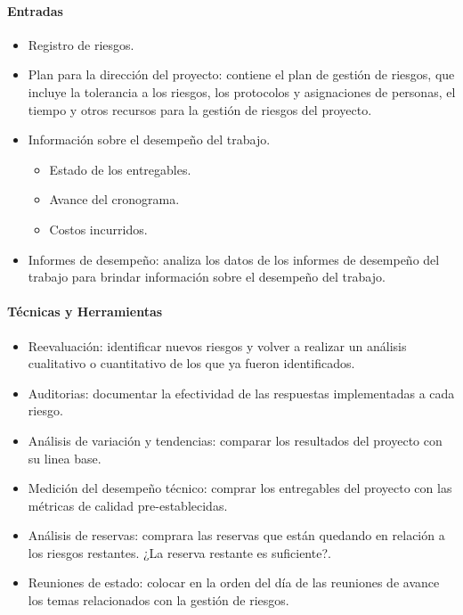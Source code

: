 \documentclass[a4paper,twosides]{article}
\newlength{\wideitemsep}
\let\olditem\item
\renewcommand{\item}{\setlength{\itemsep}{\wideitemsep}\olditem}
\begin{document}
\paragraph{Entradas}
\begin{itemize}
\item Registro de riesgos.
\item Plan para la dirección del proyecto: contiene el plan de gestión de riesgos, que incluye la tolerancia a los riesgos, los protocolos y asignaciones de personas, el tiempo y otros recursos para la gestión de riesgos del proyecto.
\item Información sobre el desempeño del trabajo.
\begin{itemize}
\item Estado de los entregables.
\item Avance del cronograma.
\item Costos incurridos.
\end{itemize}
\item Informes de desempeño: analiza los datos de los informes de desempeño del trabajo para brindar información sobre el desempeño del trabajo.
\end{itemize}

\paragraph{Técnicas y Herramientas}
\begin{itemize}
\item Reevaluación: identificar nuevos riesgos y volver a realizar un análisis cualitativo o cuantitativo de los que ya fueron identificados.
\item Auditorias: documentar la efectividad de las respuestas implementadas a cada riesgo.
\item Análisis de variación y tendencias: comparar los resultados del proyecto con su linea base.
\item Medición del desempeño técnico: comprar los entregables del proyecto con las métricas de calidad pre-establecidas.
\item Análisis de reservas: comprara las reservas que están quedando en relación a los riesgos restantes. ¿La reserva restante es suficiente?.
\item Reuniones de estado: colocar en la orden del día de las reuniones de avance los temas relacionados con la gestión de riesgos.
\end{itemize}
\end{document}
